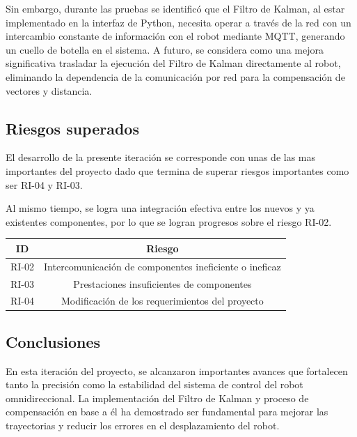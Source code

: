 Sin embargo, durante las pruebas se identificó que el Filtro de Kalman, al estar implementado en la interfaz de Python, necesita operar a través de la red con un intercambio constante de información con el robot mediante MQTT, generando un cuello de botella en el sistema. A futuro, se considera como una mejora significativa trasladar la ejecución del Filtro de Kalman directamente al robot, eliminando la dependencia de la comunicación por red para la compensación de vectores y distancia.

\subsection{Riesgos superados}
El desarrollo de la presente iteración se corresponde con unas de las mas importantes del proyecto dado que termina de superar riesgos importantes como ser RI-04 y RI-03.

Al mismo tiempo, se logra una integración efectiva entre los nuevos y ya existentes componentes, por lo que se logran progresos sobre el riesgo RI-02.

\begin{center} \begin{tabular}{|c|c|} 
    \hline
        ID & Riesgo \\
    \hline
        RI-02 & Intercomunicación de componentes ineficiente o ineficaz \\
    \hline
        RI-03 & Prestaciones insuficientes de componentes \\
    \hline
        RI-04 & Modificación de los requerimientos del proyecto \\
    \hline
\end{tabular} \end{center}

\subsection{Conclusiones}
En esta iteración del proyecto, se alcanzaron importantes avances que fortalecen tanto la precisión como la estabilidad del sistema de control del robot omnidireccional. La implementación del Filtro de Kalman y proceso de compensación en base a él ha demostrado ser fundamental para mejorar las trayectorias y reducir los errores en el desplazamiento del robot.